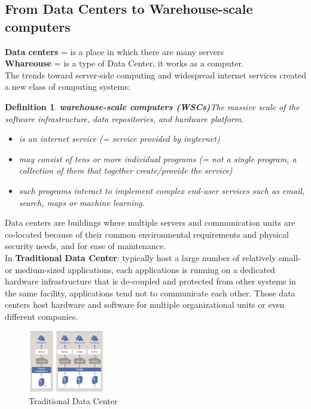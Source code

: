 \documentclass[10pt, oneside]{article}
\newtheorem{defn}{Definition}
\begin{document}
\subsection{From Data Centers to Warehouse-scale computers}
{\bf Data centers} = is a place in which there are many servers\\
{\bf Whareouse} = is a type of Data Center, it works as a computer.\\
The trends toward server-side computing and widespread internet services created a new class of computing systems:
\begin{defn}
{\bf warehouse-scale computers (WSCs)}The massive scale of the software infrastructure, data repositories, and hardware platform.
\begin{itemize}
    \item is an internet service (= service provided by inyternet)
    \item may consist of tens or more individual programs (= not a single program, a collection of them that together create/provide the service)
    \item such programs interact to implement complex end-user services such as email, search, maps or machine learning.
\end{itemize}
\end{defn}
Data centers are buildings where multiple servers and communication units are co-located because of their common environmental requirements and physical security needs, and for ease of maintenance.\\
In {\bf Traditional Data Center}: typically host a large number of relatively small- or medium-sized applications, each applications is running on a dedicated hardware infrastructure that is de-coupled and protected from other systems in the same facility, applications tend not to communicate each other. Those data centers host hardware and software for multiple organizational units or even different companies.
\begin{figure}[H]
    \begin{center}
    \includegraphics[width=0.3\textwidth]{img/img4.png}
    \caption{Traditional Data Center}
    \label{fig:Traditional Data Center}
    \end{center}
\end{figure}
\end{document}

